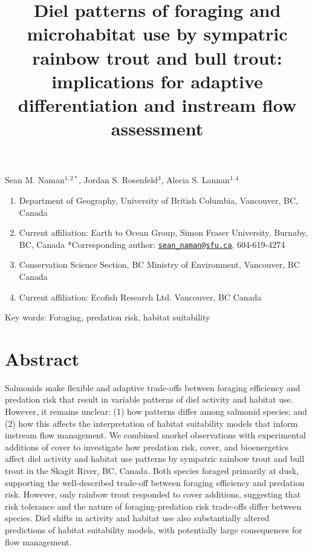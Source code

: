 \documentclass[]{article}
\title{Diel patterns of foraging and microhabitat use by sympatric rainbow
trout and bull trout: implications for adaptive differentiation and
instream flow assessment}
\author{}
\date{\vspace{-2.5em}}
\providecommand{\tightlist}{%
  \setlength{\itemsep}{0pt}\setlength{\parskip}{0pt}}
\begin{document}
\maketitle

\begin{center}
Sean M. Naman$^{1,2*}$, Jordan S. Rosenfeld$^3$, Alecia S. Lannan$^{1, 4}$
\end{center}

\vspace{2cm}

\begin{enumerate}
\def\labelenumi{\arabic{enumi}.}
\tightlist
\item
  Department of Geography, University of British Columbia, Vancouver,
  BC, Canada
\item
  Current affiliation: Earth to Ocean Group, Simon Fraser University,
  Burnaby, BC, Canada *Corresponding author:
  \href{mailto:sean_naman@sfu.ca}{\nolinkurl{sean\_naman@sfu.ca}},
  604-619-4274
\item
  Conservation Science Section, BC Ministry of Environment, Vancouver,
  BC Canada
\item
  Current affiliation: Ecofish Research Ltd. Vancouver, BC Canada
  \vspace{4cm}
\end{enumerate}

\raggedright\large
Key words: Foraging, predation risk, habitat suitability \newpage

\section{Abstract}\label{abstract}

Salmonids make flexible and adaptive trade-offs between foraging
efficiency and predation risk that result in variable patterns of diel
activity and habitat use. However, it remains unclear: (1) how patterns
differ among salmonid species; and (2) how this affects the
interpretation of habitat suitability models that inform instream flow
management. We combined snorkel observations with experimental additions
of cover to investigate how predation risk, cover, and bioenergetics
affect diel activity and habitat use patterns by sympatric rainbow trout
and bull trout in the Skagit River, BC, Canada. Both species foraged
primarily at dusk, supporting the well-described trade-off between
foraging efficiency and predation risk. However, only rainbow trout
responded to cover additions, suggesting that risk tolerance and the
nature of foraging-predation risk trade-offs differ between species.
Diel shifts in activity and habitat use also substantially altered
predictions of habitat suitability models, with potentially large
consequences for flow management.
\end{document}

